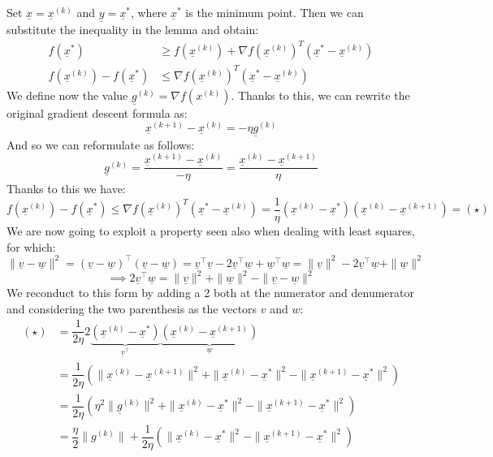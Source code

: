 Set $\underline{x} = \underline{x}^{(k)}$ and $\underline{y} = \underline{x}^*$, where $\underline{x}^*$ is the minimum point. Then we can substitute the inequality in the lemma and obtain:
\[
    \begin{split}
        f(\underline{x}^*) &\geq f(\underline{x}^{(k)}) + \nabla f(\underline{x}^{(k)})^T(\underline{x}^*-\underline{x}^{(k)})\\
        f(\underline{x}^{(k)}) - f(\underline{x}^*) &\leq \nabla f(\underline{x}^{(k)})^T(\underline{x}^*-\underline{x}^{(k)})
    \end{split}
\]
We define now the value $\underline{g}^{(k)} = \nabla f(x^{(k)})$. Thanks to this, we can rewrite the original gradient descent formula as:
\[
    \underline{x}^{(k+1)} -\underline{x}^{(k)}= - \eta \underline{g}^{(k)}    
\]
And so we can reformulate as follows:
\[
    \underline{g}^{(k)} = \frac{\underline{x}^{(k+1)} -\underline{x}^{(k)}}{-\eta} = \frac{\underline{x}^{(k)} - \underline{x}^{(k+1)}}{\eta}
\]
Thanks to this we have:
\[
    f(\underline{x}^{(k)}) - f(\underline{x}^*) \leq \nabla f(\underline{x}^{(k)})^T(\underline{x}^*-\underline{x}^{(k)}) = \dfrac{1}{\eta} (\underline{x}^{(k)} - \underline{x}^*)(\underline{x}^{(k)}-\underline{x}^{(k+1)}) = (\star)
\]
We are now going to exploit a property seen also when dealing with least squares, for which:
\[
    \|\underline{v} - \underline{w}\|^2 = (\underline{v} - \underline{w})^\intercal (\underline{v} - \underline{w}) = \underline{v}^\intercal \underline{v} - 2\underline{v}^\intercal \underline{w} + \underline{w}^\intercal \underline{w} = \|\underline{v}\|^2 - 2\underline{v}^\intercal \underline{w} + \|\underline{w}\|^2    
\]
\[
    \implies 2\underline{v}^\intercal \underline{w} = \|\underline{v}\|^2 + \|\underline{w}\|^2 - \|\underline{v} - \underline{w}\|^2    
\]
We reconduct to this form by adding a 2 both at the numerator and denumerator and considering the two parenthesis as the vectors $v$ and $w$:
\[
    \begin{split}
        (\star) &= \dfrac{1}{2 \eta} 2\underbrace{(\underline{x}^{(k)} - \underline{x}^*)}_{\underline{v}^\intercal}\underbrace{(\underline{x}^{(k)}-\underline{x}^{(k+1)})}_{\underline{w}} \\
        &= \dfrac{1}{2 \eta} \left(\|\underline{x}^{(k)} - \underline{x}^{(k+1)}\|^2 + \|\underline{x}^{(k)} - \underline{x}^*\|^2 - \|\underline{x}^{(k+1)} - \underline{x}^*\|^2 \right) \\
        &= \dfrac{1}{2 \eta} \left( \eta^2 \|\underline{g}^{(k)}\|^2 + \|\underline{x}^{(k)} - \underline{x}^*\|^2 - \|\underline{x}^{(k+1)} - \underline{x}^*\|^2 \right) \\
        &= \dfrac{\eta}{2} \|g^{(k)}\| + \dfrac{1}{2 \eta} \left( \|\underline{x}^{(k)} - \underline{x}^*\|^2 - \|\underline{x}^{(k+1)} - \underline{x}^*\|^2 \right) \\
    \end{split}
\]
